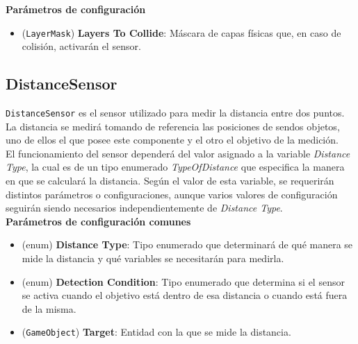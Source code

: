 \textbf{Parámetros de configuración}
\begin{itemize}
	\item (\texttt{LayerMask}) \textbf{Layers To Collide}: Máscara de capas físicas que, en caso de colisión, activarán el sensor.
\end{itemize}


\subsection{DistanceSensor}

\texttt{DistanceSensor} es el sensor utilizado para medir la distancia entre dos puntos. La distancia se medirá tomando de referencia las posiciones de sendos objetos, uno de ellos el que posee este componente y el otro el objetivo de la medición.\\

El funcionamiento del sensor dependerá del valor asignado a la variable \textit{Distance Type}, la cual es de un tipo enumerado \textit{TypeOfDistance} que especifica la manera en que se calculará la distancia. Según el valor de esta variable, se requerirán distintos parámetros o configuraciones, aunque varios valores de configuración seguirán siendo necesarios independientemente de \textit{Distance Type}.\\

\textbf{Parámetros de configuración comunes}
\begin{itemize}
	\item (enum) \textbf{Distance Type}: Tipo enumerado que determinará de qué manera se mide la distancia y qué variables se necesitarán para medirla.
	\item (enum) \textbf{Detection Condition}: Tipo enumerado que determina si el sensor se activa cuando el objetivo está dentro de esa distancia o cuando está fuera de la misma.
	\item (\texttt{GameObject})\textbf{ Target}: Entidad con la que se mide la distancia.
\end{itemize}

